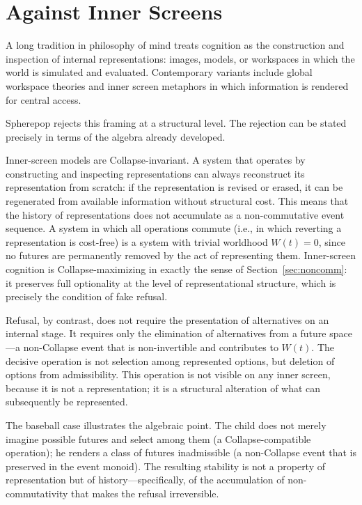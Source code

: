 \documentclass[11pt]{article}
\begin{document}
\section{Against Inner Screens}
\label{sec:innerscreen}

A long tradition in philosophy of mind treats cognition as the construction and
inspection of internal representations: images, models, or workspaces in which
the world is simulated and evaluated. Contemporary variants include global
workspace theories and inner screen metaphors in which information is rendered
for central access.

Spherepop rejects this framing at a structural level. The rejection can be
stated precisely in terms of the algebra already developed.

Inner-screen models are Collapse-invariant. A system that operates by
constructing and inspecting representations can always reconstruct its
representation from scratch: if the representation is revised or erased, it can
be regenerated from available information without structural cost. This means
that the history of representations does not accumulate as a non-commutative
event sequence. A system in which all operations commute (i.e., in which
reverting a representation is cost-free) is a system with trivial worldhood
$W(t) = 0$, since no futures are permanently removed by the act of representing
them. Inner-screen cognition is Collapse-maximizing in exactly the sense of
Section~\ref{sec:noncomm}: it preserves full optionality at the level of
representational structure, which is precisely the condition of fake refusal.

Refusal, by contrast, does not require the presentation of alternatives on an
internal stage. It requires only the elimination of alternatives from a future
space---a non-Collapse event that is non-invertible and contributes to $W(t)$.
The decisive operation is not selection among represented options, but deletion
of options from admissibility. This operation is not visible on any inner screen,
because it is not a representation; it is a structural alteration of what can
subsequently be represented.

The baseball case illustrates the algebraic point. The child does not merely
imagine possible futures and select among them (a Collapse-compatible operation);
he renders a class of futures inadmissible (a non-Collapse event that is
preserved in the event monoid). The resulting stability is not a property of
representation but of history---specifically, of the accumulation of
non-commutativity that makes the refusal irreversible.
\end{document}
